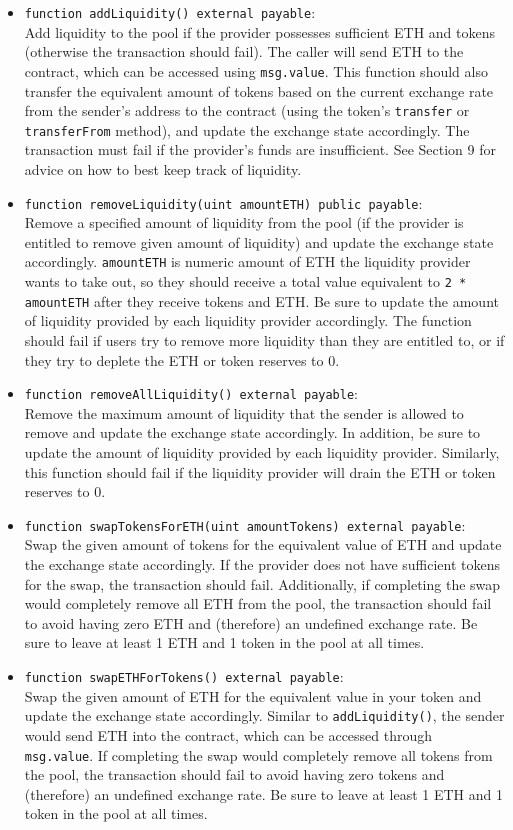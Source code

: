 \documentclass[11pt]{article}
\begin{document}
\begin{itemize}
    \item \texttt{function addLiquidity() external payable}:\\ Add liquidity to the pool if the provider possesses sufficient ETH and tokens (otherwise the transaction should fail). The caller will send ETH to the contract, which can be accessed using \texttt{msg.value}. This function should also transfer the equivalent amount of tokens based on the current exchange rate from the sender's address to the contract (using the token's \texttt{transfer} or \texttt{transferFrom} method), and update the exchange state accordingly. The transaction must fail if the provider's funds are insufficient. See Section 9 for advice on how to best keep track of liquidity. 
    \item \texttt{function removeLiquidity(uint amountETH) public payable}:\\ Remove a specified amount of liquidity from the pool (if the provider is entitled to remove given amount of liquidity) and update the exchange state accordingly. \texttt{amountETH} is numeric amount of ETH the liquidity provider wants to take out, so they should receive a total value equivalent to \texttt{2 * amountETH} after they receive tokens and ETH. Be sure to update the amount of liquidity provided by each liquidity provider accordingly. The function should fail if users try to remove more liquidity than they are entitled to, or if they try to deplete the ETH or token reserves to 0.
    \item \texttt{function removeAllLiquidity() external payable}:\\ Remove the maximum amount of liquidity that the sender is allowed to remove and update the exchange state accordingly. In addition, be sure to update the amount of liquidity provided by each liquidity provider. Similarly, this function should fail if the liquidity provider will drain the ETH or token reserves to 0.
    \item \texttt{function swapTokensForETH(uint amountTokens) external payable}:\\ Swap the given amount of tokens for the equivalent value of ETH and update the exchange state accordingly. If the provider does not have sufficient tokens for the swap, the transaction should fail. Additionally, if completing the swap would completely remove all ETH from the pool, the transaction should fail to avoid having zero ETH and (therefore) an undefined exchange rate. Be sure to leave at least 1 ETH and 1 token in the pool at all times.
    \item \texttt{function swapETHForTokens() external payable}:\\ Swap the given amount of ETH for the equivalent value in your token and update the exchange state accordingly. Similar to \texttt{addLiquidity()}, the sender would send ETH into the contract, which can be accessed through \texttt{msg.value}. If completing the swap would completely remove all tokens from the pool, the transaction should fail to avoid having zero tokens and (therefore) an undefined exchange rate. Be sure to leave at least 1 ETH and 1 token in the pool at all times.
\end{itemize}
\end{document}

